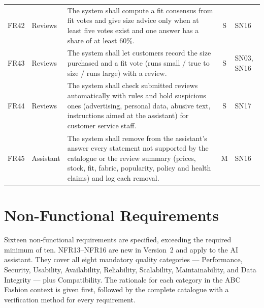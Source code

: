 \documentclass[11pt,a4paper,oneside]{extreport}
\newif\ifshowvtwo
\newcommand{\vtwocolor}{\ifshowvtwo\color{red}\fi}
\newcommand{\upd}[1]{\ifshowvtwo\textcolor{red}{#1}\else#1\fi}
\newcommand{\R}{\leavevmode\vtwocolor}   %
\begin{document}
{\begin{xltabular}{\textwidth}{@{}l L{1.7cm} Y c L{1.55cm}@{}}
\R FR42 & \R Reviews & \R The system shall compute a fit consensus from fit votes and give size advice only when at least five votes exist and one answer has a share of at least 60\%. & \R S & \R SN16 \\
\R FR43 & \R Reviews & \R The system shall let customers record the size purchased and a fit vote (runs small / true to size / runs large) with a review. & \R S & \R SN03, SN16 \\
\R FR44 & \R Reviews & \R The system shall check submitted reviews automatically with rules and hold suspicious ones (advertising, personal data, abusive text, instructions aimed at the assistant) for customer service staff. & \R S & \R SN17 \\
\R FR45 & \R Assistant & \R The system shall remove from the assistant's answer every statement not supported by the catalogue or the review summary (prices, stock, fit, fabric, popularity, policy and health claims) and log each removal. & \R M & \R SN16 \\
\end{xltabular}
}

\section{Non-Functional Requirements}
\label{sec:nfr}
\upd{Sixteen} non-functional requirements are specified, exceeding the required minimum of ten. \upd{NFR13--NFR16 are new in Version~2 and apply to the AI assistant.} They cover all eight mandatory quality categories --- Performance, Security, Usability, Availability, Reliability, Scalability, Maintainability, and Data Integrity --- plus Compatibility. The rationale for each category in the ABC Fashion context is given first, followed by the complete catalogue with a verification method for every requirement.
\end{document}
